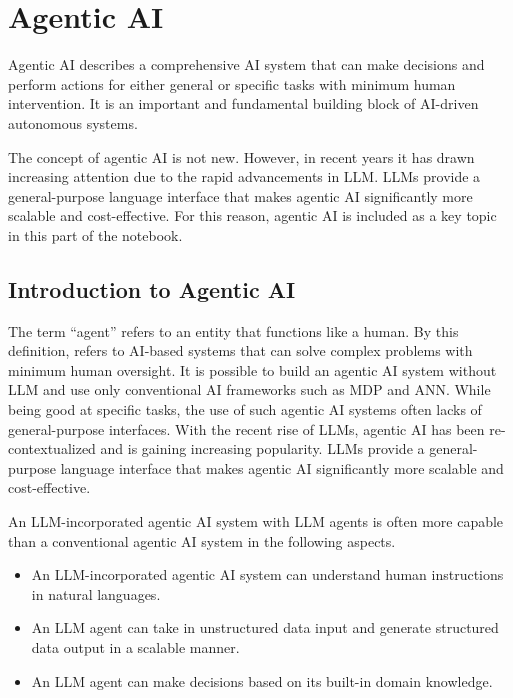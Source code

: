 \chapter{Agentic AI} 

Agentic AI describes a comprehensive AI system that can make decisions and perform actions for either general or specific tasks with minimum human intervention. It is an important and fundamental building block of AI-driven autonomous systems.

The concept of agentic AI is not new. However, in recent years it has drawn increasing attention due to the rapid advancements in LLM. LLMs provide a general-purpose language interface that makes agentic AI significantly more scalable and cost-effective. For this reason, agentic AI is included as a key topic in this part of the notebook.

\section{Introduction to Agentic AI} \label{sec:introduction_to_agentic_ai}

The term ``agent'' refers to an entity that functions like a human. By this definition,  refers to AI-based systems that can solve complex problems with minimum human oversight. It is possible to build an agentic AI system without LLM and use only conventional AI frameworks such as MDP and ANN. While being good at specific tasks, the use of such agentic AI systems often lacks of general-purpose interfaces. With the recent rise of LLMs, agentic AI has been re-contextualized and is gaining increasing popularity. LLMs provide a general-purpose language interface that makes agentic AI significantly more scalable and cost-effective. 

An LLM-incorporated agentic AI system with LLM agents is often more capable than a conventional agentic AI system in the following aspects.
\begin{itemize}
	\item An LLM-incorporated agentic AI system can understand human instructions in natural languages.
	\item An LLM agent can take in unstructured data input and generate structured data output in a scalable manner.
	\item An LLM agent can make decisions based on its built-in domain knowledge.
\end{itemize}

